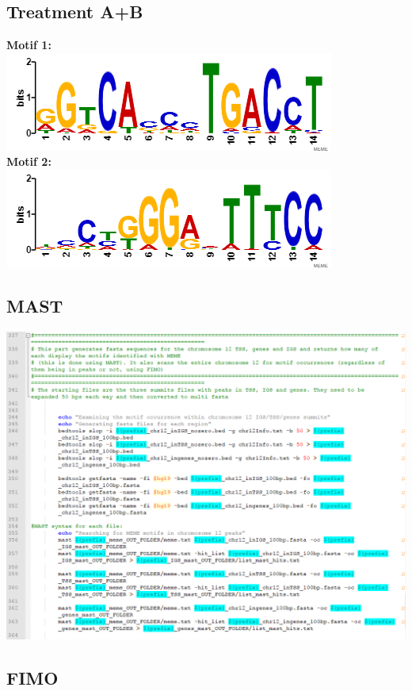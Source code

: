 \documentclass[a4paper,11pt]{article}
\begin{document}
\subsection*{Treatment A+B}
\noindent \textbf{Motif 1:} \\
\noindent \includegraphics[scale=0.75]{AB_meme1.PNG} \\
\noindent \textbf{Motif 2:} \\
\noindent \includegraphics[scale=0.75]{AB_meme2.PNG} \\

\subsection{MAST}

\noindent \includegraphics[scale=0.75]{MAST.PNG}


\subsection{FIMO}
\end{document}
